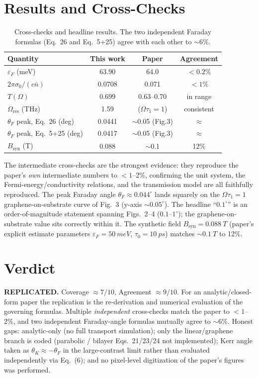 \documentclass[11pt]{article}
\begin{document}
\section{Results and Cross-Checks}
\begin{table}[h]
\centering
\begin{tabular}{lccc}
\toprule
Quantity & This work & Paper & Agreement \\
\midrule
$\varepsilon_F$ (meV)                 & 63.90  & 64.0            & $<0.2\%$ \\
$2\pi\sigma_0/(c\bar n)$              & 0.0708 & 0.071           & $<1\%$   \\
$T(\Omega)$                          & 0.699  & 0.63--0.70      & in range \\
$\Omega_{\mathrm{res}}$ (THz)        & 1.59   & ($\Omega\tau_1=1$) & consistent \\
$\theta_F$ peak, Eq.~26 (deg)        & 0.0441 & $\sim$0.05 (Fig.3) & $\approx$ \\
$\theta_F$ peak, Eq.~5+25 (deg)      & 0.0417 & $\sim$0.05 (Fig.3) & $\approx$ \\
$B_{\mathrm{syn}}$ (T)               & 0.088  & $\sim$0.1        & 12\%     \\
\bottomrule
\end{tabular}
\caption{Cross-checks and headline results. The two independent Faraday
formulas (Eq.~26 and Eq.~5+25) agree with each other to $\sim6\%$.}
\end{table}

The intermediate cross-checks are the strongest evidence: they reproduce the
paper's \emph{own} intermediate numbers to $<1$--2\%, confirming the unit
system, the Fermi-energy/conductivity relations, and the transmission model
are all faithfully reproduced. The peak Faraday angle
$\theta_F\approx0.044^\circ$ lands squarely on the $\Omega\tau_1=1$
graphene-on-substrate curve of Fig.~3 (y-axis $\sim0.05^\circ$). The headline
``$0.1^\circ$'' is an order-of-magnitude statement spanning Figs.~2--4
($0.1$--$1^\circ$); the graphene-on-substrate value sits correctly within it.
The synthetic field $B_{\mathrm{syn}}=\SI{0.088}{T}$ (paper's explicit estimate
parameters $\varepsilon_F=\SI{50}{meV}$, $\tau_0=\SI{10}{ps}$) matches
$\sim\SI{0.1}{T}$ to 12\%.

\section{Verdict}
\textbf{REPLICATED.} Coverage $\approx 7/10$, Agreement $\approx 9/10$.
For an analytic/closed-form paper the replication is the re-derivation and
numerical evaluation of the governing formulas. Multiple \emph{independent}
cross-checks match the paper to $<1$--2\%, and two independent Faraday-angle
formulas mutually agree to $\sim6\%$. Honest gaps: analytic-only (no full
transport simulation); only the linear/graphene branch is coded (parabolic /
bilayer Eqs.~21/23/24 not implemented); Kerr angle taken as
$\theta_K\approx-\theta_F$ in the large-contrast limit rather than evaluated
independently via Eq.~(6); and no pixel-level digitization of the paper's
figures was performed.
\end{document}
